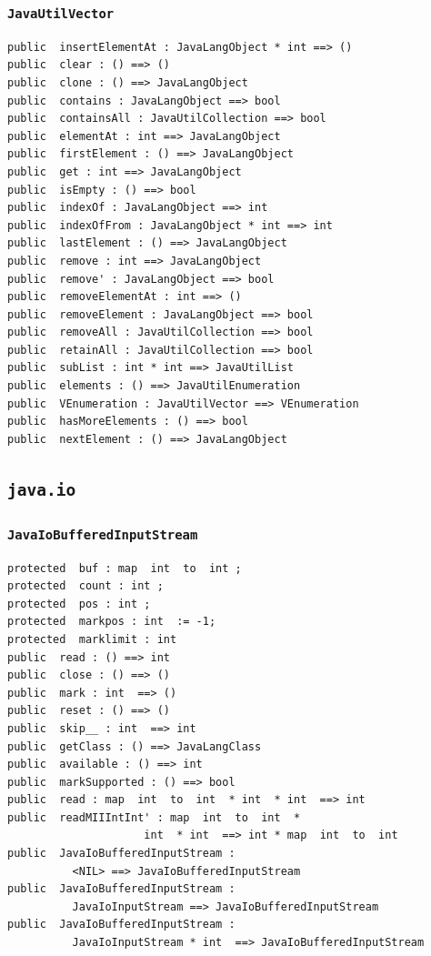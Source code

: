 \documentclass[\pformat,12pt]{article}
\begin{document}
\subsubsection{\texttt{JavaUtilVector}}
\begin{small}
\begin{verbatim}
public  insertElementAt : JavaLangObject * int ==> ()
public  clear : () ==> ()
public  clone : () ==> JavaLangObject
public  contains : JavaLangObject ==> bool
public  containsAll : JavaUtilCollection ==> bool
public  elementAt : int ==> JavaLangObject
public  firstElement : () ==> JavaLangObject
public  get : int ==> JavaLangObject
public  isEmpty : () ==> bool
public  indexOf : JavaLangObject ==> int
public  indexOfFrom : JavaLangObject * int ==> int
public  lastElement : () ==> JavaLangObject
public  remove : int ==> JavaLangObject
public  remove' : JavaLangObject ==> bool
public  removeElementAt : int ==> ()
public  removeElement : JavaLangObject ==> bool
public  removeAll : JavaUtilCollection ==> bool
public  retainAll : JavaUtilCollection ==> bool
public  subList : int * int ==> JavaUtilList
public  elements : () ==> JavaUtilEnumeration
public  VEnumeration : JavaUtilVector ==> VEnumeration
public  hasMoreElements : () ==> bool
public  nextElement : () ==> JavaLangObject
\end{verbatim}
\end{small}

\subsection{\texttt{java.io}}

\subsubsection{\texttt{JavaIoBufferedInputStream}}
\begin{small}
\begin{verbatim}
protected  buf : map  int  to  int ;
protected  count : int ;
protected  pos : int ;
protected  markpos : int  := -1;
protected  marklimit : int
public  read : () ==> int
public  close : () ==> ()
public  mark : int  ==> ()
public  reset : () ==> ()
public  skip__ : int  ==> int
public  getClass : () ==> JavaLangClass
public  available : () ==> int
public  markSupported : () ==> bool
public  read : map  int  to  int  * int  * int  ==> int
public  readMIIIntInt' : map  int  to  int  * 
                     int  * int  ==> int * map  int  to  int
public  JavaIoBufferedInputStream : 
          <NIL> ==> JavaIoBufferedInputStream
public  JavaIoBufferedInputStream : 
          JavaIoInputStream ==> JavaIoBufferedInputStream
public  JavaIoBufferedInputStream : 
          JavaIoInputStream * int  ==> JavaIoBufferedInputStream
\end{verbatim}
\end{small}
\end{document}
